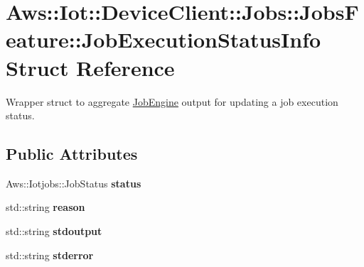 \hypertarget{struct_aws_1_1_iot_1_1_device_client_1_1_jobs_1_1_jobs_feature_1_1_job_execution_status_info}{}\section{Aws\+:\+:Iot\+:\+:Device\+Client\+:\+:Jobs\+:\+:Jobs\+Feature\+:\+:Job\+Execution\+Status\+Info Struct Reference}
\label{struct_aws_1_1_iot_1_1_device_client_1_1_jobs_1_1_jobs_feature_1_1_job_execution_status_info}


Wrapper struct to aggregate \hyperlink{class_aws_1_1_iot_1_1_device_client_1_1_jobs_1_1_job_engine}{Job\+Engine} output for updating a job execution status.  


\subsection*{Public Attributes}
\begin{DoxyCompactItemize}
\item 
\mbox{\label{struct_aws_1_1_iot_1_1_device_client_1_1_jobs_1_1_jobs_feature_1_1_job_execution_status_info_aae5af48be2dc11c257070b17b81ca123}} 
Aws\+::\+Iotjobs\+::\+Job\+Status {\bfseries status}
\item 
\mbox{\label{struct_aws_1_1_iot_1_1_device_client_1_1_jobs_1_1_jobs_feature_1_1_job_execution_status_info_aaad8e97a7c1adf33e3037e7ff9594c99}} 
std\+::string {\bfseries reason}
\item 
\mbox{\label{struct_aws_1_1_iot_1_1_device_client_1_1_jobs_1_1_jobs_feature_1_1_job_execution_status_info_aa1ada87fdda714692b2e6de1ab6417a5}} 
std\+::string {\bfseries stdoutput}
\item 
\mbox{\label{struct_aws_1_1_iot_1_1_device_client_1_1_jobs_1_1_jobs_feature_1_1_job_execution_status_info_a83681cf08133b927d3ae489f26343a66}} 
std\+::string {\bfseries stderror}
\end{DoxyCompactItemize}


